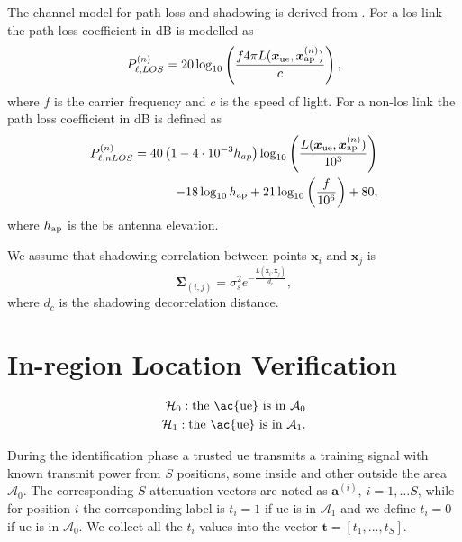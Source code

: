 \documentclass[conference,draftcls,onecolumn]{IEEEtran}
\begin{document}
The channel model for path loss and shadowing is derived from \cite{3gpp}. For a \ac{los} link the path loss coefficient in dB is modelled as
\begin{equation}\label{eq:los}
    P_{\ell,LOS}^{(n)} = 20\log_{10}\left(\frac{f 4\pi L(\bm{x}_{\rm ue},\bm{x}_{\rm ap}^{(n)})}{c}\right),
\end{equation}
where $f$ is the carrier frequency and $c$ is the speed of light. For a  non-\ac{los} link the path loss coefficient in dB is defined as
\begin{equation}
\begin{split}
    P_{\ell, nLOS}^{(n)} = 40\left(1-4 \cdot 10^{-3}  h_{ap}\right) \log_{10}\left (\frac{L(\bm{x}_{\rm ue},\bm{x}_{\rm ap}^{(n)})}{10^3}\right ) \\
    -18\log_{10}h_{\rm ap}
    + 21\log_{10}\left(\frac{f}{10^6}\right) + 80,
    \end{split}
\end{equation}
where $h_{\rm ap}$ is the \ac{bs} antenna elevation.

We assume that shadowing correlation between points $\bm{x}_i$ and $\bm{x}_j$ is
\begin{equation}\label{eq: coor mat}
    \bm{\Sigma}_{(i,j)} = \sigma_s^2e^{-\frac{L(\bm{x}_i,\bm{x}_j)}{d_c}},
\end{equation}
where $d_c$ is the shadowing decorrelation distance. 


\section{In-region Location Verification}\label{sec: ml}

 \begin{equation}
\begin{split}
  \mathcal H_0: \mbox{the \ac{ue} is in $\mathcal{A}_0$} \\
  \mathcal H_1: \mbox{the \ac{ue} is in $\mathcal{A}_1$}. 
  \end{split}
\end{equation}

During the identification phase a trusted \ac{ue} transmits a training signal with known transmit power from $S$ positions, some inside and other outside the area $\mathcal A_0$. The corresponding $S$ attenuation vectors are noted as $\bm{a}^{(i)}, \ i=1,\dots S$, while for position $i$ the corresponding label is $t_i=1$ if \ac{ue} is in $\mathcal A_1$ and we define $t_i=0$ if \ac{ue} is in $\mathcal A_0$. We collect all the $t_i$ values into the vector $\bm{t}=[t_1,...,t_S]$.
\end{document}
